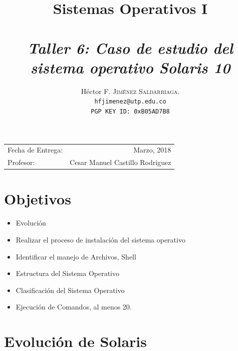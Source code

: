 \documentclass[paper=a4, fontsize=12pt]{article} 		%
\title{Sistemas Operativos I\\ 
\horrule{0.5pt} \\[0.4cm] 								%
\textit{Taller 6: Caso de estudio del sistema operativo Solaris 10}
\horrule{1pt} \\[0.5cm] 			
}
\author{												
Héctor F. \textsc{Jiménez Saldarriaga.}\\				%
\texttt{hfjimenez@utp.edu.co} \\						
\texttt{PGP KEY ID: 0xB05AD7B8}
}
\date{}    						                       %
\numberwithin{equation}{section}						%
\numberwithin{table}{section} 							%
\begin{document}
\maketitle                      			           %
\begin{center}
\begin{tabular}{l r}								   %
Fecha de Entrega: & Marzo, 2018 \\				   %
Profesor: & Cesar Manuel Castillo Rodriguez
\end{tabular}
\end{center}
\section{Objetivos}
\begin{itemize}
	\item Evolución
	\item Realizar el proceso de instalación del sistema operativo	
    \item Identificar el manejo de Archivos, Shell
    \item Estructura del Sistema Operativo
    \item Clasificación del Sistema Operativo
	\item Ejecución de Comandos, al menos 20.
\end{itemize}
\section{Evolución de Solaris} 
\end{document}
